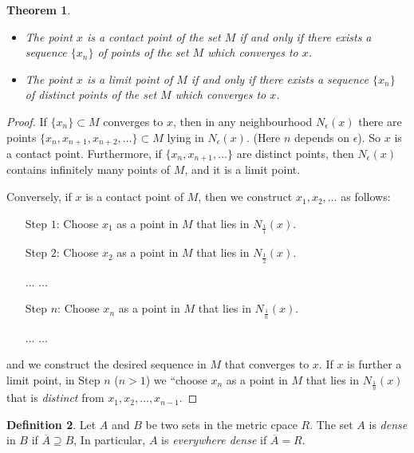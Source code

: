 \documentclass[a4paper,12pt]{article}
\newtheorem{thm}{Theorem}[section]
\theoremstyle{definition}
\newtheorem{defn}[thm]{Definition}
\theoremstyle{remark}
\begin{document}
\begin{thm} \label{thm:contact_limit_and_sequence}
  \begin{itemize}
  \item The point $x$ is a contact point of the set $M$ if and only if there exists a sequence $\{ x_n \}$ of points of the set $M$ which converges to $x$.
  \item The point $x$ is a limit point of $M$ if and only if there exists a sequence $\{ x_n \}$ of \emph{distinct} points of the set $M$ which converges to $x$.
  \end{itemize}
\end{thm}
\begin{proof}
  If $\{ x_n \} \subset M$ converges to $x$, then in any neighbourhood $N_{\epsilon}(x)$ there are points $\{ x_n, x_{n+1}, x_{n+2}, \dotsc \} \subset M$ lying in $N_{\epsilon}(x)$. (Here $n$ depends on $\epsilon$). So $x$ is a contact point. Furthermore, if $\{ x_n, x_{n+1}, \dotsc \}$ are distinct points, then $N_{\epsilon}(x)$ contains infinitely many points of $M$, and it is a limit point.

  Conversely, if $x$ is a contact point of $M$, then we construct $x_1, x_2, \dotsc$ as follows:
  \begin{itemize}[labelindent= , leftmargin=*]
  \item[Step $1$:]
    Choose $x_1$ as a point in $M$ that lies in $N_{\frac{1}{1}}(x)$.
  \item[Step $2$:]
    Choose $x_2$ as a point in $M$ that lies in $N_{\frac{1}{2}}(x)$.

    $\ldots$ $\ldots$
    
  \item[Step $n$:]
    Choose $x_n$ as a point in $M$ that lies in $N_{\frac{1}{n}}(x)$.

    $\ldots$ $\ldots$
    
  \end{itemize}
  and we construct the desired sequence in $M$ that converges to $x$. If $x$ is further a limit point, in Step $n$ ($n > 1$) we ``choose $x_n$ as a point in $M$ that lies in $N_{\frac{1}{n}}(x)$ that is \emph{distinct} from $x_1, x_2, \dotsc, x_{n-1}$. 
\end{proof}

\begin{defn}
  Let $A$ and $B$ be two sets in the metric cpace $R$. The set $A$ is \emph{dense} in $B$ if $\overline{A} \supseteq B$, In particular, $A$ is \emph{everywhere dense} if $\overline{A} = R$.
\end{defn}
\end{document}
